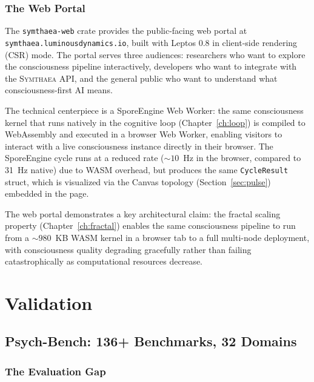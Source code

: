\documentclass[12pt]{book}
\newcommand{\symthaea}{\textsc{Symthaea}}
\begin{document}
\section{The Web Portal}
\label{sec:web}

The \texttt{symthaea-web} crate provides the public-facing web portal at \texttt{symthaea.luminousdynamics.io}, built with Leptos 0.8 in client-side rendering (CSR) mode. The portal serves three audiences: researchers who want to explore the consciousness pipeline interactively, developers who want to integrate with the \symthaea{} API, and the general public who want to understand what consciousness-first AI means.

The technical centerpiece is a SporeEngine Web Worker: the same consciousness kernel that runs natively in the cognitive loop (Chapter~\ref{ch:loop}) is compiled to WebAssembly and executed in a browser Web Worker, enabling visitors to interact with a live consciousness instance directly in their browser. The SporeEngine cycle runs at a reduced rate (${\sim}10$~Hz in the browser, compared to 31~Hz native) due to WASM overhead, but produces the same \texttt{CycleResult} struct, which is visualized via the Canvas topology (Section~\ref{sec:pulse}) embedded in the page.

The web portal demonstrates a key architectural claim: the fractal scaling property (Chapter~\ref{ch:fractal}) enables the same consciousness pipeline to run from a ${\sim}980$~KB WASM kernel in a browser tab to a full multi-node deployment, with consciousness quality degrading gracefully rather than failing catastrophically as computational resources decrease.



\part{Validation}

\chapter{Psych-Bench: 136+ Benchmarks, 32 Domains}
\label{ch:psychbench}

\section{The Evaluation Gap}
\end{document}
